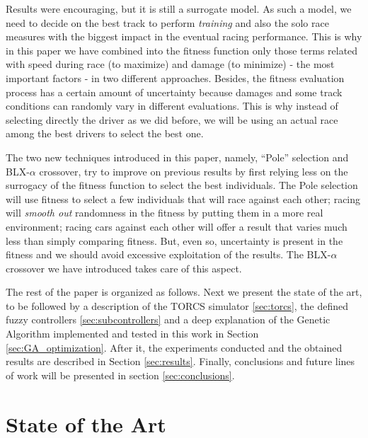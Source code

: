 \documentclass[conference]{IEEEtran}
\begin{document}
Results were encouraging, but it is still a surrogate model. As such a
model, we need to decide on the best track to perform {\em training}
and also the solo race measures with the biggest impact in the
eventual racing performance. This is why in this paper we have
combined into the fitness function only those terms related with speed
during race (to maximize) and damage (to minimize) - the most
important factors - in two different approaches. 
Besides, the fitness evaluation process has a certain amount of uncertainty because damages and some track conditions can randomly vary in different
evaluations. This is why instead of selecting directly the driver as
we did before, we will be using an actual race among the best drivers
to select the best one.

The two new techniques introduced in this paper, namely, ``Pole''
selection and BLX-$\alpha$ crossover, try to improve on previous
results by first relying less on the surrogacy of the fitness function
to select the best individuals. The Pole selection will use fitness to
select a few individuals that will race against each other; racing
will {\em smooth out} randomness in the fitness by putting them in a
more real environment; racing cars against each other will offer a
result that varies much less than simply comparing fitness. But, even
so, uncertainty is present in the fitness and we should avoid
excessive exploitation of the results. The BLX-$\alpha$ crossover we
have introduced takes care of this aspect.

The rest of the paper is organized as follows. Next we present the
state of the art, to be followed by a description of the TORCS
simulator \ref{sec:torcs}, the defined fuzzy controllers \ref{sec:subcontrollers} and a deep explanation of the Genetic Algorithm implemented and tested in this work in Section \ref{sec:GA_optimization}. 
After it, the experiments conducted and the obtained results are described in Section \ref{sec:results}. Finally, conclusions and future lines of work will be presented in section \ref{sec:conclusions}.


\section{State of the Art}
\label{sec:soa}
\end{document}
